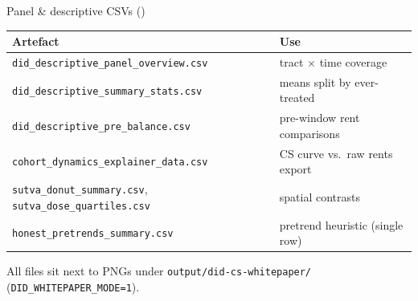 
\begin{frame}{Panel \& descriptive CSVs (\texttt{})}
\vfill
\begin{tabular}{ll}
\toprule
\textbf{Artefact} & \textbf{Use} \\
\midrule
\texttt{did\_descriptive\_panel\_overview.csv} & tract \(\times\) time coverage \\
\texttt{did\_descriptive\_summary\_stats.csv} & means split by ever-treated \\
\texttt{did\_descriptive\_pre\_balance.csv} & pre-window rent comparisons \\
\texttt{cohort\_dynamics\_explainer\_data.csv} & CS curve vs.\ raw rents export \\
\texttt{sutva\_donut\_summary.csv}, \texttt{sutva\_dose\_quartiles.csv} & spatial contrasts \\
\texttt{honest\_pretrends\_summary.csv} & pretrend heuristic (single row) \\
\bottomrule
\end{tabular}
\vfill
{\footnotesize All files sit next to PNGs under \texttt{output/did-cs-whitepaper/} (\texttt{DID\_WHITEPAPER\_MODE=1}).}
\vfill
\end{frame}
